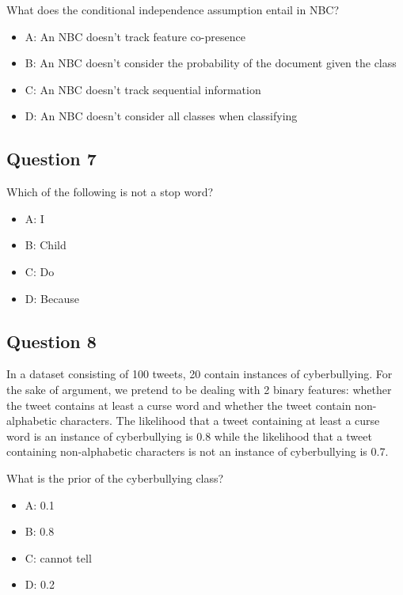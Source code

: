 \documentclass[
  11pt,
  british,
]{article}
\providecommand{\tightlist}{%
  \setlength{\itemsep}{0pt}\setlength{\parskip}{0pt}}
\begin{document}
What does the conditional independence assumption entail in NBC?

\begin{itemize}
\tightlist
\item
  A: An NBC doesn't track feature co-presence
\item
  B: An NBC doesn't consider the probability of the document given the
  class
\item
  C: An NBC doesn't track sequential information
\item
  D: An NBC doesn't consider all classes when classifying
\end{itemize}

\hypertarget{question-7}{%
\subsection{Question 7}\label{question-7}}

Which of the following is not a stop word?

\begin{itemize}
\tightlist
\item
  A: I
\item
  B: Child
\item
  C: Do
\item
  D: Because
\end{itemize}

\hypertarget{question-8}{%
\subsection{Question 8}\label{question-8}}

In a dataset consisting of 100 tweets, 20 contain instances of
cyberbullying. For the sake of argument, we pretend to be dealing with 2
binary features: whether the tweet contains at least a curse word and
whether the tweet contain non-alphabetic characters. The likelihood that
a tweet containing at least a curse word is an instance of cyberbullying
is 0.8 while the likelihood that a tweet containing non-alphabetic
characters is not an instance of cyberbullying is 0.7.

What is the prior of the cyberbullying class?

\begin{itemize}
\tightlist
\item
  A: 0.1
\item
  B: 0.8
\item
  C: cannot tell
\item
  D: 0.2
\end{itemize}
\end{document}
